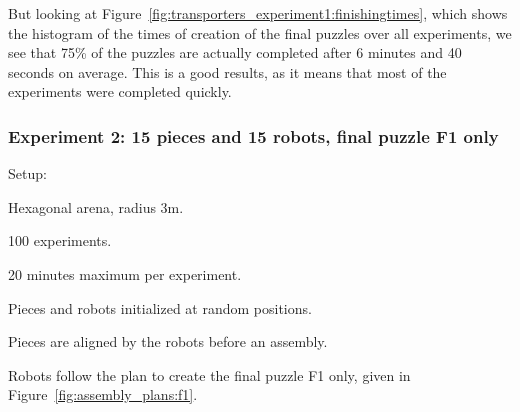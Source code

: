 But looking at Figure~\ref{fig:transporters_experiment1:finishingtimes}, which shows the histogram of the times of creation of the final puzzles over all experiments, we see that 75\% of the puzzles are actually completed after 6 minutes and 40 seconds on average. This is a good results, as it means that most of the experiments were completed quickly.


\subsubsection{Experiment 2: 15 pieces and 15 robots, final puzzle F1 only} %
\label{ssub:experiment_2_15_pieces_and_15_robots_final_puzzle_f1_only}

Setup:
\begin{my_itemize}
	\item Hexagonal arena, radius 3m.
	\item 100 experiments.
	\item 20 minutes maximum per experiment.
	\item Pieces and robots initialized at random positions.
	\item Pieces are aligned by the robots before an assembly.
	\item Robots follow the plan to create the final puzzle F1 only, given in Figure~\ref{fig:assembly_plans:f1}.
\end{my_itemize}

